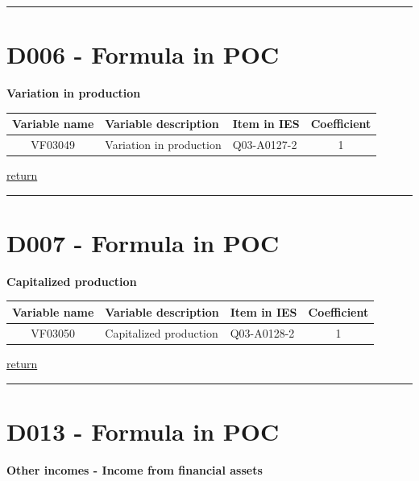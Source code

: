 \documentclass[]{book}
\begin{document}
\begin{center}\rule{0.5\linewidth}{\linethickness}\end{center}

\hypertarget{d006---formula-in-poc}{%
\section{D006 - Formula in POC}\label{d006---formula-in-poc}}

\textbf{Variation in production}

\begin{longtable}[]{@{}cllc@{}}
\toprule
Variable name & Variable description & Item in IES & Coefficient\tabularnewline
\midrule
\endhead
VF03049 & Variation in production & Q03-A0127-2 & 1\tabularnewline
\bottomrule
\end{longtable}

\protect\hyperlink{b3.-profit-and-loss-statement-variables}{return}

\begin{center}\rule{0.5\linewidth}{\linethickness}\end{center}

\hypertarget{d007---formula-in-poc}{%
\section{D007 - Formula in POC}\label{d007---formula-in-poc}}

\textbf{Capitalized production}

\begin{longtable}[]{@{}cllc@{}}
\toprule
Variable name & Variable description & Item in IES & Coefficient\tabularnewline
\midrule
\endhead
VF03050 & Capitalized production & Q03-A0128-2 & 1\tabularnewline
\bottomrule
\end{longtable}

\protect\hyperlink{b3.-profit-and-loss-statement-variables}{return}

\begin{center}\rule{0.5\linewidth}{\linethickness}\end{center}

\hypertarget{d013---formula-in-poc}{%
\section{D013 - Formula in POC}\label{d013---formula-in-poc}}

\textbf{Other incomes - Income from financial assets}
\end{document}
